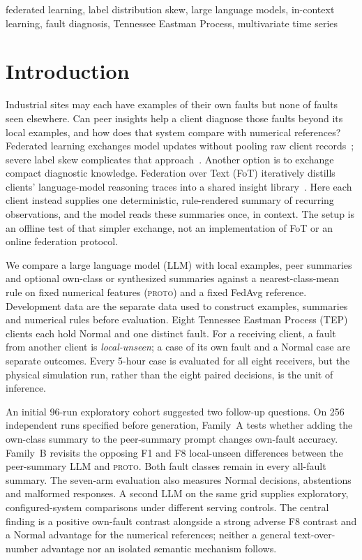 \documentclass[conference]{IEEEtran}
\newcommand{\TEP}{TEP}
\newcommand{\PROTO}{\textsc{proto}}
\begin{document}
\begin{IEEEkeywords}
federated learning, label distribution skew, large language models, in-context learning, fault diagnosis, Tennessee Eastman Process, multivariate time series
\end{IEEEkeywords}

\section{Introduction}
\label{sec:intro}
Industrial sites may each have examples of their own faults but none of faults seen elsewhere. Can peer insights help a client diagnose those faults beyond its local examples, and how does that system compare with numerical references? Federated learning exchanges model updates without pooling raw client records~\cite{mcmahan2017fedavg}; severe label skew complicates that approach~\cite{li2022noniid}. Another option is to exchange compact diagnostic knowledge. Federation over Text (FoT) iteratively distills clients' language-model reasoning traces into a shared insight library~\cite{yao2026fot}. Here each client instead supplies one deterministic, rule-rendered summary of recurring observations, and the model reads these summaries once, in context. The setup is an offline test of that simpler exchange, not an implementation of FoT or an online federation protocol.

We compare a large language model (LLM) with local examples, peer summaries and optional own-class or synthesized summaries against a nearest-class-mean rule on fixed numerical features (\PROTO{}) and a fixed FedAvg reference. Development data are the separate data used to construct examples, summaries and numerical rules before evaluation. Eight Tennessee Eastman Process (\TEP{}) clients each hold Normal and one distinct fault. For a receiving client, a fault from another client is \emph{local-unseen}; a case of its own fault and a Normal case are separate outcomes. Every 5-hour case is evaluated for all eight receivers, but the physical simulation run, rather than the eight paired decisions, is the unit of inference.

An initial 96-run exploratory cohort suggested two follow-up questions. On 256 independent runs specified before generation, Family~A tests whether adding the own-class summary to the peer-summary prompt changes own-fault accuracy. Family~B revisits the opposing F1 and F8 local-unseen differences between the peer-summary LLM and \PROTO{}. Both fault classes remain in every all-fault summary. The seven-arm evaluation also measures Normal decisions, abstentions and malformed responses. A second LLM on the same grid supplies exploratory, configured-system comparisons under different serving controls. The central finding is a positive own-fault contrast alongside a strong adverse F8 contrast and a Normal advantage for the numerical references; neither a general text-over-number advantage nor an isolated semantic mechanism follows.
\end{document}
